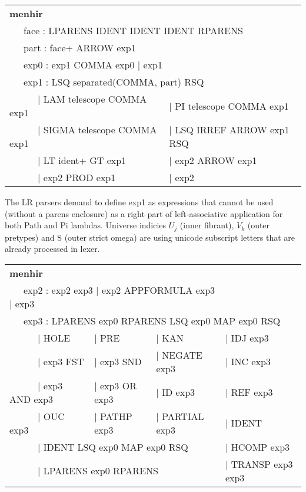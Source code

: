 \documentclass[a4paper,UKenglish,cleveref, autoref, thm-restate]{lipics-v2021}
\newcommand{\tabstyle}[0]{\scriptsize\ttfamily\fontseries{l}\selectfont}
\begin{document}
\begin{table}[ht!]
\tabstyle
\begin{tabular}{ll}
\textbf{menhir} \\
\multicolumn{2}{l}{\ \ \ face : LPARENS IDENT IDENT IDENT RPARENS } \\
\multicolumn{2}{l}{\ \ \ part : face+ ARROW exp1 } \\
\multicolumn{2}{l}{\ \ \ exp0 : exp1 COMMA exp0 | exp1 } \\
\multicolumn{2}{l}{\ \ \ exp1 : LSQ separated(COMMA, part) RSQ } \\
\ \ \ \ \ \ | LAM telescope COMMA exp1   & | PI telescope COMMA exp1 \\
\ \ \ \ \ \ | SIGMA telescope COMMA exp1 & | LSQ IRREF ARROW exp1 RSQ \\
\ \ \ \ \ \ | LT ident+ GT exp1          & | exp2 ARROW exp1 \\
\ \ \ \ \ \ | exp2 PROD exp1             & | exp2 \\
\end{tabular}
\end{table}

The LR parsers demand to define exp1 as expressions that cannot be used (without a parens enclosure)
as a right part of left-associative application for both Path and Pi lambdas.
Universe indicies $U_j$ (inner fibrant), $V_k$ (outer pretypes) and S (outer strict omega)
are using unicode subscript letters that are already processed in lexer.

\begin{table}[ht!]
\tabstyle
\begin{tabular}{llll}
\textbf{menhir} \\
\multicolumn{3}{l}{\ \ \ exp2 : exp2 exp3 | exp2 APPFORMULA exp3 | exp3 } \\
\multicolumn{4}{l}{\ \ \ exp3 : LPARENS exp0 RPARENS LSQ exp0 MAP exp0 RSQ } \\
\ \ \ \ \ \   | HOLE              & | PRE          & | KAN          & | IDJ exp3 \\
\ \ \ \ \ \   | exp3 FST          & | exp3 SND     & | NEGATE exp3  & | INC exp3 \\
\ \ \ \ \ \   | exp3 AND exp3     & | exp3 OR exp3 & | ID exp3      & | REF exp3\\
\ \ \ \ \ \   | OUC exp3          & | PATHP exp3   & | PARTIAL exp3 & | IDENT \\
\multicolumn{3}{l}{\ \ \ \ \ \    | IDENT LSQ exp0 MAP exp0 RSQ }   & | HCOMP exp3 \\
\multicolumn{3}{l}{\ \ \ \ \ \    | LPARENS exp0 RPARENS }          & | TRANSP exp3 exp3 \\
\end{tabular}
\end{table}
\end{document}
